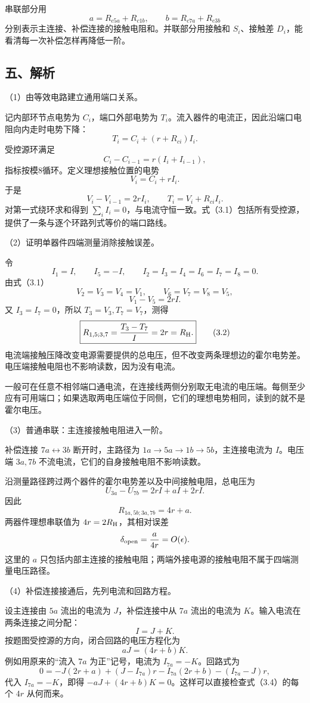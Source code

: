 \documentclass[12pt,a4paper,fontset=fandol]{ctexart}
\begin{document}
串联部分用 \[
a=R_{c5a}+R_{c1b},\qquad
b=R_{c7a}+R_{c3b}
\] 分别表示主连接、补偿连接的接触电阻和。并联部分用接触和
\(S_i\)、接触差 \(D_i\)，能看清每一次补偿怎样再降低一阶。

\subsection{五、解析}\label{ux4e94ux89e3ux6790-2}

（1）由等效电路建立通用端口关系。

记内部环节点电势为 \(C_i\)，端口外部电势为
\(T_i\)。流入器件的电流正，因此沿端口电阻向内走时电势下降： \[
T_i=C_i+(r+R_{ci})I_i.
\] 受控源环满足 \[
C_i-C_{i-1}=r(I_i+I_{i-1}),
\] 指标按模8循环。定义理想接触位置的电势 \[
V_i=C_i+rI_i.
\] 于是 \[
V_i-V_{i-1}=2rI_i,\qquad
T_i=V_i+R_{ci}I_i.\tag{3.1}
\] 对第一式绕环求和得到
\(\sum_iI_i=0\)，与电流守恒一致。式（3.1）包括所有受控源，提供了一条与逐个环路列式等价的端口路线。

（2）证明单器件四端测量消除接触误差。

令 \[
I_1=I,\qquad I_5=-I,\qquad
I_2=I_3=I_4=I_6=I_7=I_8=0.
\] 由式（3.1） \[
V_2=V_3=V_4=V_1,\qquad
V_6=V_7=V_8=V_5,
\] \[
V_1-V_5=2rI.
\] 又 \(I_3=I_7=0\)，所以 \(T_3=V_3,T_7=V_7\)，测得 \[
\boxed{R_{1,5;3,7}=\frac{T_3-T_7}{I}=2r=R_{\rm H}.}\tag{3.2}
\]
电流端接触压降改变电源需要提供的总电压，但不改变两条理想边的霍尔电势差。电压端接触电阻也不影响读数，因为没有电流。

一般可在任意不相邻端口通电流，在连接线两侧分别取无电流的电压端。每侧至少应有可用端口；如果选取两电压端位于同侧，它们的理想电势相同，读到的就不是霍尔电压。

（3）普通串联：主连接接触电阻进入一阶。

补偿连接 \(7a\leftrightarrow3b\) 断开时，主路径为
\(1a\to5a\to1b\to5b\)，主连接电流为 \(I\)。电压端 \(3a,7b\)
不流电流，它们的自身接触电阻不影响读数。

沿测量路径跨过两个器件的霍尔电势差以及中间接触电阻，总电压为 \[
U_{3a}-U_{7b}=2rI+aI+2rI.
\] 因此 \[
\boxed{R_{1a,5b;3a,7b}=4r+a.}\tag{3.3}
\] 两器件理想串联值为 \(4r=2R_{\rm H}\)，其相对误差 \[
\delta_{\rm open}=\frac{a}{4r}=O(\epsilon).
\] 这里的 \(a\)
只包括内部主连接的接触电阻；两端外接电源的接触电阻不属于四端测量电压路径。

（4）补偿连接接通后，先列电流和回路方程。

设主连接由 \(5a\) 流出的电流为 \(J\)，补偿连接中从 \(7a\) 流出的电流为
\(K\)。输入电流在两条连接之间分配： \[
I=J+K.
\] 按题图受控源的方向，闭合回路的电压方程化为 \[
aJ=(4r+b)K.\tag{3.4}
\] 例如用原来的``流入 \(7a\) 为正''记号，电流为 \(I_{7a}=-K\)。回路式为
\[
0=-J(2r+a)+(J-I_{7a})r
-I_{7a}(2r+b)-(I_{7a}-J)r,
\] 代入 \(I_{7a}=-K\)，即得
\(-aJ+(4r+b)K=0\)。这样可以直接检查式（3.4）的每个 \(4r\) 从何而来。
\end{document}
